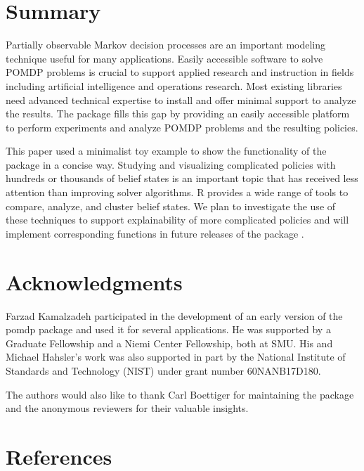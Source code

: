 \hypertarget{summary}{%
\section{Summary}\label{summary}}

Partially observable Markov decision processes are an important modeling technique useful
for many applications.
Easily accessible software to solve POMDP problems is crucial to support applied research and instruction in fields including artificial intelligence and operations research. Most existing libraries need advanced technical expertise to install and offer minimal support to analyze the results. The  package fills this gap by providing an easily accessible platform to perform experiments and analyze POMDP problems and the resulting policies.

This paper used a minimalist toy example to show the functionality of the package in
a concise way.
Studying and visualizing complicated policies with hundreds or thousands of belief states
is an important topic that has received less attention than improving solver algorithms.
R provides a wide range of tools to compare, analyze, and cluster belief states. We plan
to investigate the use of these techniques to support
explainability of more complicated policies and will implement corresponding functions in
future releases of the package .

\hypertarget{acknowledgments}{%
\section{Acknowledgments}\label{acknowledgments}}

Farzad Kamalzadeh participated in the development of an early version of the pomdp package
and used it for several applications.
He was supported by a Graduate Fellowship and a Niemi Center Fellowship, both at SMU.
His and Michael Hahsler's work was also supported in part by
the National Institute of Standards and Technology (NIST) under grant number 60NANB17D180.

The authors would also like to thank Carl Boettiger for maintaining the package
 and the anonymous reviewers for their valuable insights.

\hypertarget{references}{%
\section*{References}\label{references}}

